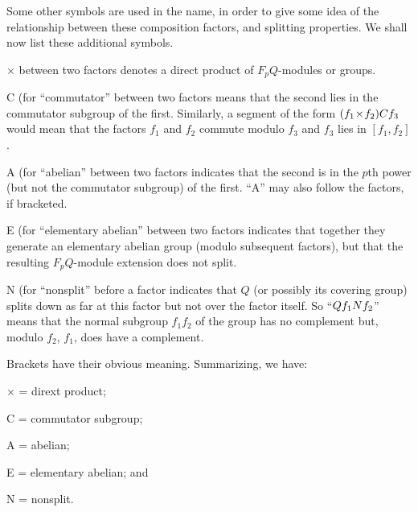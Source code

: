 {Some  other symbols are used  in the name, in order  to give some idea of
the   relationship  between these    composition  factors, and  splitting
properties. We shall now list these additional symbols.
\item{$\times$}  between  two  factors   denotes   a  direct  product  of
      $F_pQ$-modules or groups.
\item{C} (for ``commutator''  between two factors  means  that the second
      lies in the commutator subgroup of the first.  Similarly, a segment
      of the form  $(f_1 \! \times \! f_2) {\sl C} f_3$  would mean  that
      the factors $f_1$ and $f_2$  commute modulo $f_3$ and $f_3$ lies in
      $[f_1,f_2]$.
\item{A} (for ``abelian''  between two factors  indicates that the second
      is  in the  $p$th  power  (but not the commutator subgroup)  of the
      first.   ``A''   may  also   follow  the  factors,   if  bracketed.
\item{E} (for ``elementary abelian''  between two factors  indicates that
      together   they  generate  an  elementary  abelian  group   (modulo
      subsequent factors), but that the resulting $F_pQ$-module extension
      does not split.
\item{N}  (for ``nonsplit''  before  a  factor  indicates  that  $Q$  (or
      possibly its covering group)  splits down as far at this factor but
      not over the factor itself.  So  ``$Q f_1 {\sl N} f_2$'' means that
      the normal subgroup  $f_1f_2$  of the group  has no complement but,
      modulo $f_2$, $f_1$, does have a complement.

Brackets have their obvious meaning. Summarizing, we have:
\item{$\times$} = dirext product;
\item{C} = commutator subgroup;
\item{A} = abelian;
\item{E} = elementary abelian; and
\item{N} = nonsplit.

}

